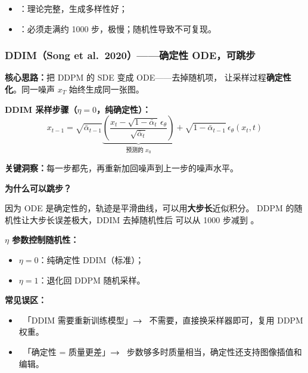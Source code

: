 \begin{itemize}
  \item {}：理论完整，生成多样性好；
  \item {}：必须走满约 1000 步，极慢；随机性导致不可复现。
\end{itemize}

\subsubsection{DDIM（Song et al.\ 2020）——确定性 ODE，可跳步}

\begin{intubox}
\textbf{核心思路：}把 DDPM 的 SDE 变成 ODE——去掉随机项，
让采样过程\textbf{确定性化}。同一噪声 $x_T$ 始终生成同一张图。
\end{intubox}

\begin{conceptbox}
\textbf{DDIM 采样步骤（$\eta = 0$，纯确定性）：}
$$x_{t-1} = \sqrt{\bar\alpha_{t-1}}
  \underbrace{\left(\frac{x_t - \sqrt{1-\bar\alpha_t}\,\epsilon_\theta}
  {\sqrt{\bar\alpha_t}}\right)}_{\text{预测的 }x_0}
  + \sqrt{1-\bar\alpha_{t-1}}\,\epsilon_\theta(x_t, t)$$
\end{conceptbox}

\textbf{关键洞察：}每一步都先，再重新加回噪声到上一步的噪声水平。

\textbf{为什么可以跳步？}

\begin{intubox}
因为 ODE 是确定性的，轨迹是平滑曲线，可以用\textbf{大步长}近似积分。
DDPM 的随机性让大步长误差极大，DDIM 去掉随机性后
可以从 1000 步减到 。
\end{intubox}

\textbf{$\eta$ 参数控制随机性：}
\begin{itemize}
  \item $\eta = 0$：纯确定性 DDIM（标准）；
  \item $\eta = 1$：退化回 DDPM 随机采样。
\end{itemize}

\begin{warnbox}
\textbf{常见误区：}
\begin{itemize}
  \item {}~「DDIM 需要重新训练模型」\;\textbf{→}\;
        ~不需要，直接换采样器即可，复用 DDPM 权重。
  \item {}~「确定性 = 质量更差」\;\textbf{→}\;
        ~步数够多时质量相当，确定性还支持图像插值和编辑。
\end{itemize}
\end{warnbox}

